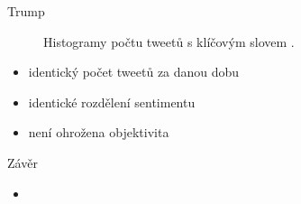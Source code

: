 \documentclass[notheorems,12pt]{beamer}
\begin{document}
\begin{frame}{Trump}
    \begin{figure}
        \centering
        \vspace{-0.7cm}
        \caption*{Histogramy počtu tweetů s klíčovým slovem \textit{}.}
    \end{figure}
	\begin{itemize}
		\item identický počet tweetů za danou dobu
        \item identické rozdělení sentimentu
        \item není ohrožena objektivita
	\end{itemize}
\end{frame}
\begin{frame}{Závěr}
	\begin{itemize}
		\item
	\end{itemize}
\end{frame}
\end{document}
